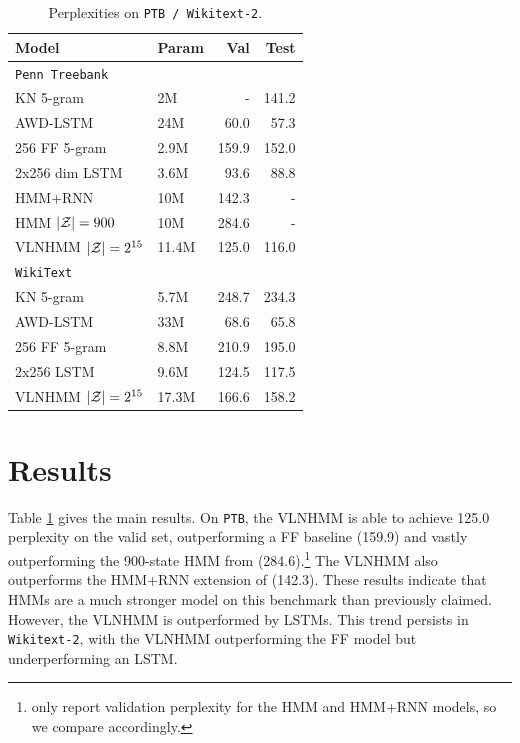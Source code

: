 \documentclass[11pt,a4paper]{article}
\begin{document}
\begin{table}[!t]
\centering
\begin{tabular}{llrr}
\toprule
Model & Param & Val  & Test \\
\midrule
\texttt{Penn Treebank}\\
\midrule
KN 5-gram              & 2M   & - & 141.2\\
AWD-LSTM               & 24M  & 60.0 & 57.3\\
256 FF 5-gram          & 2.9M & 159.9      & 152.0  \\
2x256 dim LSTM         & 3.6M & 93.6       & 88.8   \\
HMM+RNN                & 10M  & 142.3 & -\\
HMM $|\mathcal{Z}|=900$       & 10M  & 284.6 & -\\
VLNHMM $|\mathcal{Z}|=2^{15}$ & 11.4M & 125.0      & 116.0  \\
\midrule
\texttt{WikiText}\\
\midrule
KN 5-gram               & 5.7M    & 248.7 & 234.3\\
AWD-LSTM                & 33M     & 68.6  & 65.8\\
256 FF 5-gram           & 8.8M    & 210.9 & 195.0\\
2x256  LSTM             & 9.6M    & 124.5 & 117.5\\
VLNHMM $|\mathcal{Z}|=2^{15}$  & 17.3M   & 166.6  & 158.2\\
\bottomrule
\end{tabular}
\caption{\label{tbl:ppl}
Perplexities on \texttt{PTB / Wikitext-2}.
}
\end{table}


\section{Results}
Table \ref{tbl:ppl} gives the main results.
On \texttt{PTB}, the VLNHMM is able to achieve 125.0 perplexity on the valid set,
outperforming a FF baseline (159.9)
and vastly outperforming the 900-state HMM from \citet{buys2018hmm} (284.6).\footnote{
\citet{buys2018hmm} only report validation perplexity
for the HMM and HMM+RNN models, so we compare accordingly.}
The VLNHMM also outperforms the HMM+RNN extension of \citet{buys2018hmm} (142.3).
These results indicate that HMMs are a much stronger model
on this benchmark than previously claimed.
However, the VLNHMM is outperformed by LSTMs.
This trend persists in \texttt{Wikitext-2},
with the VLNHMM outperforming the FF model but underperforming an LSTM.
\end{document}
